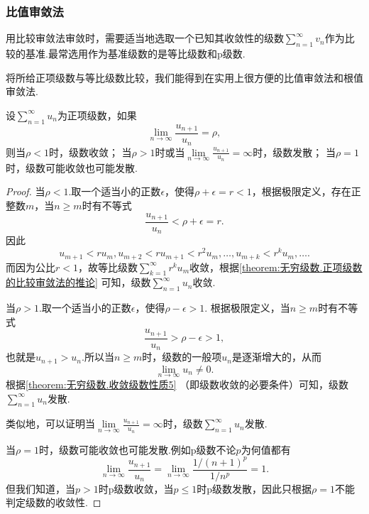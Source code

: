 \subsubsection{比值审敛法}
用比较审敛法审敛时，需要适当地选取一个已知其收敛性的级数\(\sum\limits_{n=1}^\infty v_n\)作为比较的基准.最常选用作为基准级数的是等比级数和p级数.

将所给正项级数与等比级数比较，我们能得到在实用上很方便的比值审敛法和根值审敛法.
\begin{theorem}\label{theorem:无穷级数.正项级数的比值审敛法}
设\(\sum\limits_{n=1}^\infty u_n\)为正项级数，如果\[
\lim\limits_{n\to\infty} \frac{u_{n+1}}{u_n}=\rho,
\]则当\(\rho<1\)时，级数收敛；
当\(\rho>1\)时或当\(\lim\limits_{n\to\infty} \frac{u_{n+1}}{u_n}=\infty\)时，级数发散；
当\(\rho=1\)时，级数可能收敛也可能发散.
\begin{proof}
当\(\rho<1\).取一个适当小的正数\(\epsilon\)，使得\(\rho+\epsilon=r<1\)，根据极限定义，存在正整数\(m\)，当\(n \geq m\)时有不等式\[
\frac{u_{n+1}}{u_n} < \rho + \epsilon = r.
\]因此\[
u_{m+1} < r u_m,
u_{m+2} < r u_{m+1} < r^2 u_m,
\dotsc,
u_{m+k} < r^k u_m,
\dotsc.
\]而因为公比\(r<1\)，故等比级数\(\sum\limits_{k=1}^\infty r^k u_m\)收敛，根据\cref{theorem:无穷级数.正项级数的比较审敛法的推论} 可知，级数\(\sum\limits_{n=1}^\infty u_n\)收敛.

当\(\rho>1\).取一个适当小的正数\(\epsilon\)，使得\(\rho-\epsilon>1\).
根据极限定义，当\(n \geq m\)时有不等式\[
\frac{u_{n+1}}{u_n} > \rho-\epsilon > 1,
\]也就是\(u_{n+1}>u_n\).所以当\(n \geq m\)时，级数的一般项\(u_n\)是逐渐增大的，从而\[
\lim\limits_{n\to\infty} u_n \neq 0.
\]根据\cref{theorem:无穷级数.收敛级数性质5} （即级数收敛的必要条件）可知，级数\(\sum\limits_{n=1}^\infty u_n\)发散.

类似地，可以证明当\(\lim\limits_{n\to\infty} \frac{u_{n+1}}{u_n} = \infty\)时，级数\(\sum\limits_{n=1}^\infty u_n\)发散.

当\(\rho = 1\)时，级数可能收敛也可能发散.例如p级数不论\(p\)为何值都有\[
\lim\limits_{n\to\infty} \frac{u_{n+1}}{u_n} = \lim\limits_{n\to\infty} \frac{1/(n+1)^p}{1/n^p} = 1.
\]但我们知道，当\(p>1\)时p级数收敛，当\(p\leq1\)时p级数发散，因此只根据\(\rho=1\)不能判定级数的收敛性.
\end{proof}
\end{theorem}


